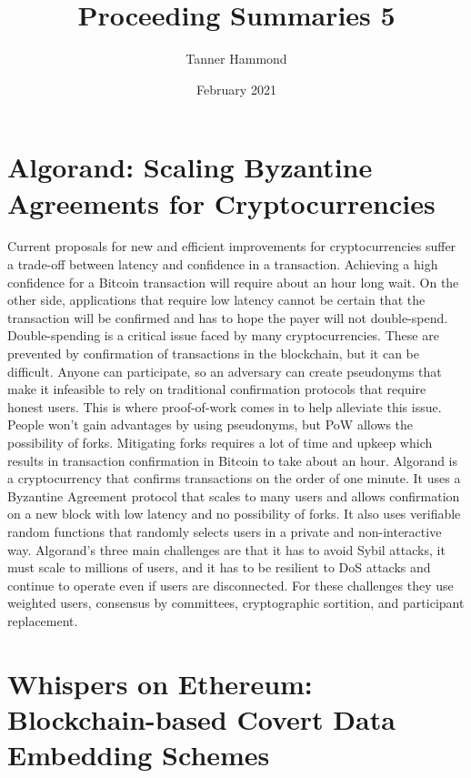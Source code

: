 \documentclass{article}
\title{Proceeding Summaries 5}
\author{Tanner Hammond}
\date{February 2021}
\begin{document}
\maketitle

\section{Algorand: Scaling Byzantine Agreements for Cryptocurrencies \cite{Algorand}}

Current proposals for new and efficient improvements for cryptocurrencies suffer a trade-off between latency and confidence in a transaction. Achieving a high confidence for a Bitcoin transaction will require about an hour long wait. On the other side, applications that require low latency cannot be certain that the transaction will be confirmed and has to hope the payer will not double-spend. Double-spending is a critical issue faced by many cryptocurrencies. These are prevented by confirmation of transactions in the blockchain, but it can be difficult. Anyone can participate, so an adversary can create pseudonyms that make it infeasible to rely on traditional confirmation protocols that require honest users. This is where proof-of-work comes in to help alleviate this issue. People won't gain advantages by using pseudonyms, but PoW allows the possibility of forks. Mitigating forks requires a lot of time and upkeep which results in transaction confirmation in Bitcoin to take about an hour. Algorand is a cryptocurrency that confirms transactions on the order of one minute. It uses a Byzantine Agreement protocol that scales to many users and allows confirmation on a new block with low latency and no possibility of forks. It also uses verifiable random functions that randomly selects users in a private and non-interactive way. Algorand's three main challenges are that it has to avoid Sybil attacks, it must scale to millions of users, and it has to be resilient to DoS attacks and continue to operate even if users are disconnected. For these challenges they use weighted users, consensus by committees, cryptographic sortition, and participant replacement. 

\section{Whispers on Ethereum: Blockchain-based Covert Data Embedding Schemes \cite{Whispers}}
\end{document}
